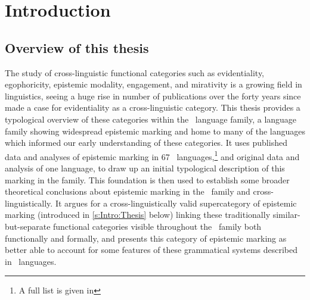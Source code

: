 \chapter{Introduction}\label{c:Introduction}
\section{Overview of this thesis}
The study of cross-linguistic functional categories such as evidentiality, egophoricity, epistemic modality, engagement, and mirativity is a growing field in linguistics, seeing a huge rise in number of publications over the forty years since  made a case for evidentiality as a cross-linguistic category. This thesis provides a typological overview of these categories within the \lfam\ language family, a language family showing widespread epistemic marking and home to many of the languages which informed our early understanding of these categories. It uses published data and analyses of epistemic marking in 67 \lfam\ languages,\footnote{A full list is given in } and original data and analysis of one language, to draw up an initial typological description of this marking in the family. This foundation is then used to establish some broader theoretical conclusions about epistemic marking in the \lfam\ family and cross-linguistically. It argues for a cross-linguistically valid supercategory of epistemic marking (introduced in \ref{s:Intro:Thesis} below) linking these traditionally similar-but-separate functional categories visible throughout the \lfam\ family both functionally and formally, and presents this category of epistemic marking as better able to account for some features of these grammatical systems described in \lfam\ languages.

